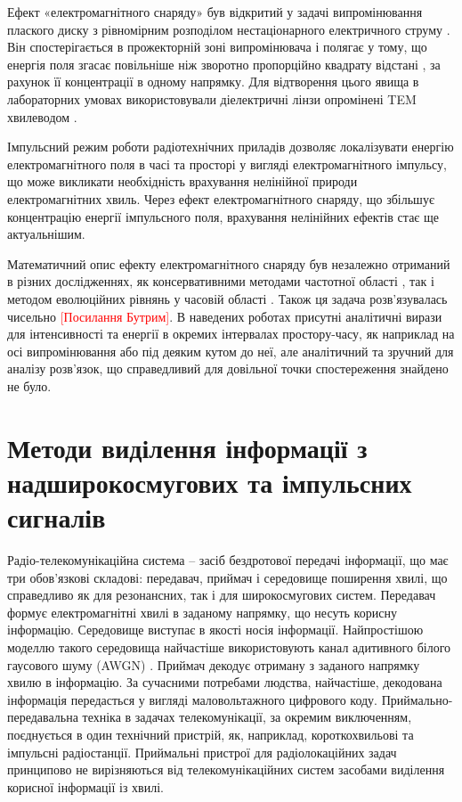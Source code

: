 Ефект «електромагнітного снаряду» був відкритий у задачі випромінювання 
плаского диску з рівномірним розподілом нестаціонарного електричного струму 
\cite{imp:Wu1985}. Він спостерігається в прожекторній зоні випромінювача і 
полягає у тому, що енергія поля згасає повільніше ніж зворотно пропорційно 
квадрату відстані \cite{imp:Sodin1992-10}, за рахунок її концентрації в 
одному напрямку. Для відтворення цього явища в лабораторних умовах 
використовували діелектричні лінзи опромінені TEM хвилеводом \cite{imp:Wu1991}.

Імпульсний режим роботи радіотехнічних приладів дозволяє локалізувати енергію 
електромагнітного поля в часі та просторі у вигляді електромагнітного 
імпульсу, що може викликати необхідність врахування нелінійної природи 
електромагнітних хвиль. Через ефект електромагнітного снаряду, що збільшує 
концентрацію енергії імпульсного поля, врахування нелінійних ефектів стає 
ще актуальнішим.

Математичний опис ефекту електромагнітного снаряду був незалежно отриманий 
в різних дослідженнях, як консервативними методами частотної області
\cite{imp:Wu1987, imp:Samsonov1986}, так і методом еволюційних рівнянь у 
часовій області \cite{imp:Dumin1996}. Також ця задача розв'язувалась 
чисельно \textcolor{red}{[Посилання Бутрим]}. В наведених роботах присутні
аналітичні вирази для інтенсивності та енергії в окремих інтервалах 
простору-часу, як наприклад на осі випромінювання або під деяким кутом до 
неї, але аналітичний та зручний для аналізу розв'язок, що справедливий для 
довільної точки спостереження знайдено не було.

\section{Методи виділення інформації з надширокосмугових та імпульсних сигналів}

Радіо-телекомунікаційна система -- засіб бездротової передачі інформації, що 
має три обов'язкові складові: передавач, приймач і середовище поширення 
хвилі, що справедливо як для резонансних, так і для широкосмугових систем. 
Передавач формує електромагнітні хвилі в заданому напрямку,  що несуть корисну 
інформацію. Середовище виступає в якості носія інформації. Найпростішою моделлю
такого середовища найчастіше використовують канал адитивного білого гаусового 
шуму (AWGN) \cite{imp:Lazorenko2009}. Приймач декодує отриману з заданого 
напрямку хвилю в інформацію. За сучасними потребами людства, найчастіше, 
декодована інформація передасться у вигляді маловольтажного цифрового коду. 
Приймально-передавальна техніка в задачах телекомунікації, за окремим 
виключенням, поєднується в один технічний пристрій, як, наприклад, 
короткохвильові та імпульсні радіостанції. Приймальні пристрої для 
радіолокаційних задач принципово не вирізняються від телекомунікаційних 
систем засобами виділення корисної інформації із хвилі.

